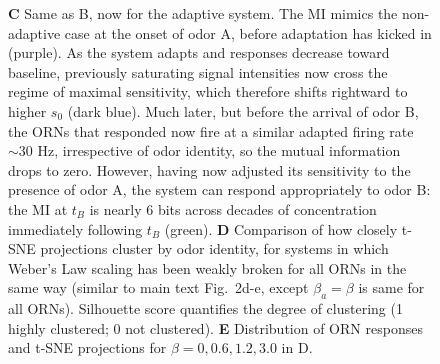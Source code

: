 \documentclass[9pt,twoside]{pnas-new}
\begin{document}
\begin{figure}
{\textbf{C} Same as B, now for the adaptive system. The MI mimics the non-adaptive case at the onset of odor A, before adaptation has kicked in (purple). As the system adapts and responses decrease toward baseline, previously saturating signal intensities now cross the regime of maximal sensitivity, which therefore shifts rightward to higher $s_0$ (dark blue). Much later, but before the arrival of odor B, the ORNs that responded now fire at a similar  adapted firing rate $\sim 30$ Hz, irrespective of odor identity, so the mutual information drops to zero. However, having now adjusted its sensitivity to the presence of odor A, the system can respond appropriately to odor B: the MI at $t_B$ is nearly 6 bits across decades of concentration immediately following $t_B$ (green). 
\textbf{D}  Comparison of how closely t-SNE projections cluster by odor identity, for systems in which Weber’s Law scaling has been weakly broken for all ORNs in the same way (similar to main text Fig.~2d-e, except $\beta_a = \beta$ is same for all ORNs). Silhouette score quantifies the degree of clustering (1 highly clustered; 0 not clustered). 
\textbf{E} Distribution of ORN responses and t-SNE projections for $\beta = 0, 0.6, 1.2, 3.0$ in D.
}
\label{fig:SI_MI}
\end{figure}
\end{document}
